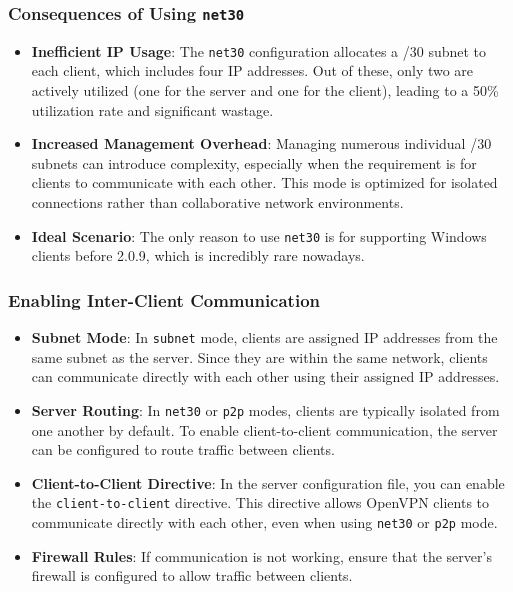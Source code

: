 \subsubsection{Consequences of Using \texttt{net30}}
\begin{itemize}
\item \textbf{Inefficient IP Usage}: The \texttt{net30} configuration allocates a /30 subnet to each client, which includes four IP addresses. Out of these, only two are actively utilized (one for the server and one for the client), leading to a 50\% utilization rate and significant wastage.
\item \textbf{Increased Management Overhead}: Managing numerous individual /30 subnets can introduce complexity, especially when the requirement is for clients to communicate with each other. This mode is optimized for isolated connections rather than collaborative network environments.
\item \textbf{Ideal Scenario}: The only reason to use \texttt{net30} is for supporting Windows clients before 2.0.9, which is incredibly rare nowadays. 
\end{itemize}

\subsubsection{Enabling Inter-Client Communication}
\begin{itemize}
    \item \textbf{Subnet Mode}: In \texttt{subnet} mode, clients are assigned IP addresses from the same subnet as the server. Since they are within the same network, clients can communicate directly with each other using their assigned IP addresses. 
    \item \textbf{Server Routing}: In \texttt{net30} or \texttt{p2p} modes, clients are typically isolated from one another by default. To enable client-to-client communication, the server can be configured to route traffic between clients.
    \item \textbf{Client-to-Client Directive}: In the server configuration file, you can enable the \texttt{client-to-client} directive. This directive allows OpenVPN clients to communicate directly with each other, even when using \texttt{net30} or \texttt{p2p} mode. 
    \item \textbf{Firewall Rules}: If communication is not working, ensure that the server's firewall is configured to allow traffic between clients.
\end{itemize}


